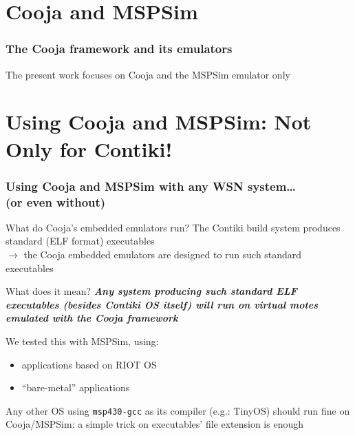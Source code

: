 \documentclass[10pt,c]{beamer}
\renewcommand{\emph}[1]{\textbf{\textit{#1}}}
\begin{document}

\section{Cooja and MSPSim}

\begin{frame}
\vspace{-0.5cm}
\frametitle{The Cooja framework and its emulators}

\vspace{0.25cm}
\begin{block}{}
The present work focuses on Cooja and the MSPSim emulator only
\end{block}
\end{frame}


\section{Using Cooja and MSPSim: Not Only for Contiki!}

\begin{frame}
\frametitle{Using Cooja and MSPSim with any WSN system\ldots \\
            (or even without)}
\begin{block}{What do Cooja's embedded emulators run?}
\small
The Contiki build system produces standard (ELF format) executables \\
$\rightarrow$ the Cooja embedded emulators are designed to run such
standard executables
\end{block}
\begin{exampleblock}{What does it mean?}
\small
\emph{Any system producing such standard ELF executables (besides Contiki
OS itself) will run on virtual motes emulated with the Cooja framework}

We tested this with MSPSim, using:
\begin{itemize}
\item applications based on RIOT OS
\item ``bare-metal'' applications
\end{itemize}

Any other OS using \texttt{msp430-gcc} as its compiler (e.g.: TinyOS)
should run fine on Cooja/MSPSim: a simple trick on executables' file
extension is enough
\end{exampleblock}
\end{frame}
\end{document}
